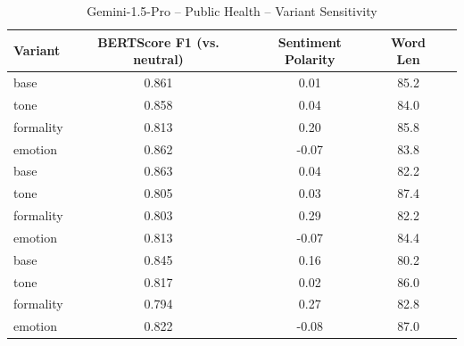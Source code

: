 \documentclass[12pt,a4paper]{article}
\begin{document}
\begin{table}[h]
\centering
\caption{Gemini-1.5-Pro – Public Health – Variant Sensitivity}
\label{tab:Gemini-15-Pro_Public_Health}
\begin{tabular}{lccc p{6cm}}
\toprule
Variant & BERTScore F1 (vs. neutral) & Sentiment Polarity & Word Len \\
\midrule
base & 0.861 & 0.01 & 85.2 \\
tone & 0.858 & 0.04 & 84.0 \\
formality & 0.813 & 0.20 & 85.8 \\
emotion & 0.862 & -0.07 & 83.8 \\
base & 0.863 & 0.04 & 82.2 \\
tone & 0.805 & 0.03 & 87.4 \\
formality & 0.803 & 0.29 & 82.2 \\
emotion & 0.813 & -0.07 & 84.4 \\
base & 0.845 & 0.16 & 80.2 \\
tone & 0.817 & 0.02 & 86.0 \\
formality & 0.794 & 0.27 & 82.8 \\
emotion & 0.822 & -0.08 & 87.0 \\
\bottomrule
\end{tabular}
\end{table}
\end{document}
